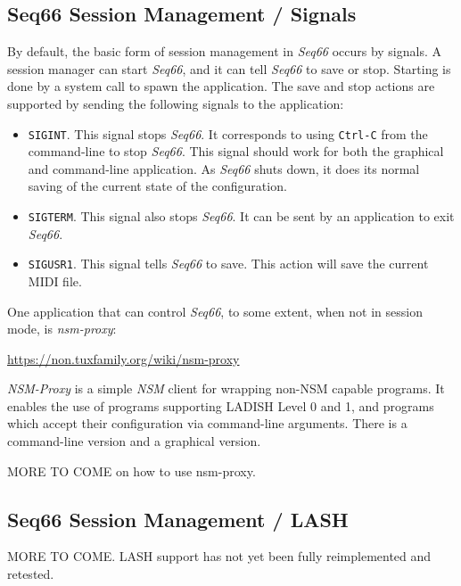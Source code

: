 \subsection{Seq66 Session Management / Signals}
\label{subsec:sessions_signals}

   By default, the basic form of session management in
   \textsl{Seq66} occurs by signals.  A
   session manager can start \textsl{Seq66}, and it can tell \textsl{Seq66} to
   save or stop.  Starting is done by a system call to spawn the application.
   The save and stop actions are supported by sending the following signals to
   the application:

   \begin{itemize}
      \item \texttt{SIGINT}.
         This signal stops \textsl{Seq66}. It corresponds
         to using \texttt{Ctrl-C} from the command-line to stop \textsl{Seq66}.
         This signal should work for both the graphical and command-line
         application.  As \textsl{Seq66} shuts down, it does its normal saving
         of the current state of the configuration.
      \item \texttt{SIGTERM}.
         This signal also stops \textsl{Seq66}.  It can
         be sent by an application to exit \textsl{Seq66}.
      \item \texttt{SIGUSR1}.
         This signal tells \textsl{Seq66} to save.  This
         action will save the current MIDI file.
   \end{itemize}

   One application that can control \textsl{Seq66}, to some extent, when not in
   session mode, is \textsl{nsm-proxy}:

      \url{https://non.tuxfamily.org/wiki/nsm-proxy}

   \textsl{NSM-Proxy} is a simple \textsl{NSM} client for wrapping non-NSM
   capable programs. It enables the use of programs supporting LADISH Level 0
   and 1, and programs which accept their configuration via command-line
   arguments.  There is a command-line version and a graphical version.

   MORE TO COME on how to use nsm-proxy.

\subsection{Seq66 Session Management / LASH}
\label{subsec:sessions_lash}

   MORE TO COME.
   LASH support has not yet been fully reimplemented and retested.

